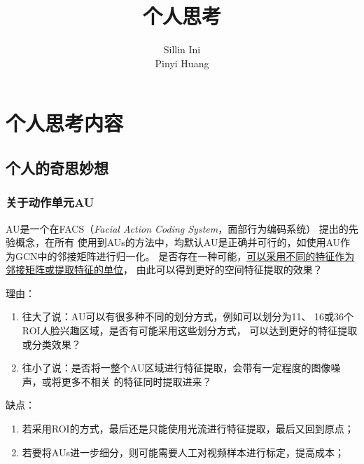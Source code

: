 \documentclass[AutoFakeBold]{MyFormat}
\begin{document}
%
%


\title{{个人思考}}
\author{Sillin Ini\\Pinyi Huang}
\maketitle
\thispagestyle{empty}
\newpage

\tableofcontents
\thispagestyle{empty}
\newpage

\mainmatter




\setcounter{chapter}{0}

\chapter{个人思考内容}
\section{个人的奇思妙想}
\subsection{关于动作单元AU}
\par AU是一个在FACS（\textit{Facial Action Coding System}，面部行为编码系统）
提出的先验概念，在所有
使用到AUs的方法中，均默认AU是正确并可行的，如使用AU作为GCN中的邻接矩阵进行归一化。
是否存在一种可能，\underline{可以采用不同的特征作为邻接矩阵或提取特征的单位}，
由此可以得到更好的空间特征提取的效果？
\par 理由：
\begin{enumerate}
    \item 往大了说：AU可以有很多种不同的划分方式，例如可以划分为11、
    16或36个ROI人脸兴趣区域，是否有可能采用这些划分方式，
    可以达到更好的特征提取或分类效果？
    \item 往小了说：是否将一整个AU区域进行特征提取，会带有一定程度的图像噪声，或将更多不相关
    的特征同时提取进来？
\end{enumerate}
\par 缺点：
\begin{enumerate}
    \item 若采用ROI的方式，最后还是只能使用光流进行特征提取，最后又回到原点；
    \item 若要将AUs进一步细分，则可能需要人工对视频样本进行标定，提高成本；
\end{enumerate}
\end{document}
